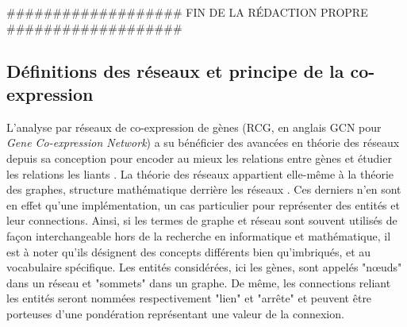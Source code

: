 


\#\#\#\#\#\#\#\#\#\#\#\#\#\#\#\#\#\#\# FIN DE LA RÉDACTION PROPRE \#\#\#\#\#\#\#\#\#\#\#\#\#\#\#\#\#\#\#

\subsection{Définitions des réseaux et principe de la co-expression}

L'analyse par réseaux de co-expression de gènes (RCG, en anglais GCN pour \textit{Gene Co-expression Network}) a su bénéficier des avancées en théorie des réseaux depuis sa conception pour encoder au mieux les relations entre gènes et étudier les relations les liants \cite{Barabasi2011Jan}. La théorie des réseaux appartient elle-même à la théorie des graphes, structure mathématique derrière les réseaux \cite{Barnes1983Jun}. Ces derniers n'en sont en effet qu'une implémentation, un cas particulier pour représenter des entités et leur connections. Ainsi, si les termes de graphe et réseau sont souvent utilisés de façon interchangeable hors de la recherche en informatique et  mathématique, il est à noter qu'ils désignent des concepts différents bien qu'imbriqués, et au vocabulaire spécifique. Les entités considérées, ici les gènes, sont appelés "nœuds" dans un réseau et "sommets" dans un graphe. De même, les connections reliant les entités seront nommées respectivement "lien" et "arrête" et peuvent être porteuses d'une pondération représentant une valeur de la connexion. 


